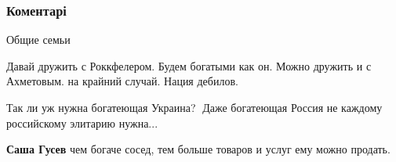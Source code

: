 
 
 
 
 
\subsubsection{Коментарі}

\begin{itemize}
 
Общие семьи

 
Давай дружить с Роккфелером. Будем богатыми как он. Можно дружить и с Ахметовым. на крайний случай. Нация дебилов.

 
Так ли уж нужна богатеющая Украина?🤔
Даже богатеющая Россия не каждому российскому элитарию нужна...

\begin{itemize}
 
\textbf{Саша Гусев} чем богаче сосед, тем больше товаров и услуг ему можно продать.

 

\end{itemize}
\end{itemize}
